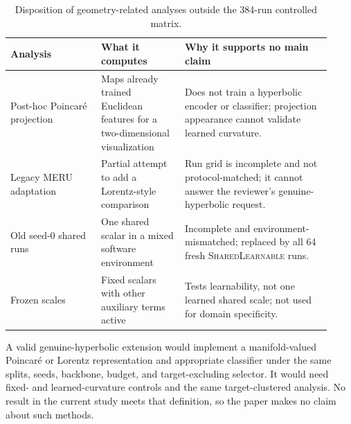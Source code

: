 \documentclass[10pt]{article}
\newcommand{\shared}{\textsc{SharedLearnable}}
\begin{document}
\begin{table}[H]
\centering
\caption{Disposition of geometry-related analyses outside the 384-run
controlled matrix.}
\label{tab:excluded}
\small
\begin{tabular}{p{0.26\linewidth}p{0.24\linewidth}p{0.42\linewidth}}
\toprule
Analysis & What it computes & Why it supports no main claim \\
\midrule
Post-hoc Poincar\'e projection & Maps already trained Euclidean features for a
two-dimensional visualization & Does not train a hyperbolic encoder or
classifier; projection appearance cannot validate learned curvature. \\
Legacy MERU adaptation & Partial attempt to add a Lorentz-style comparison &
Run grid is incomplete and not protocol-matched; it cannot answer the
reviewer's genuine-hyperbolic request. \\
Old seed-0 shared runs & One shared scalar in a mixed software environment &
Incomplete and environment-mismatched; replaced by all 64 fresh
\shared{} runs. \\
Frozen scales & Fixed scalars with other auxiliary terms active & Tests
learnability, not one learned shared scale; not used for domain specificity. \\
\bottomrule
\end{tabular}
\end{table}

A valid genuine-hyperbolic extension would implement a manifold-valued
Poincar\'e or Lorentz representation and appropriate classifier under the same
splits, seeds, backbone, budget, and target-excluding selector. It would need
fixed- and learned-curvature controls and the same target-clustered analysis.
No result in the current study meets that definition, so the paper makes no
claim about such methods.
\end{document}
